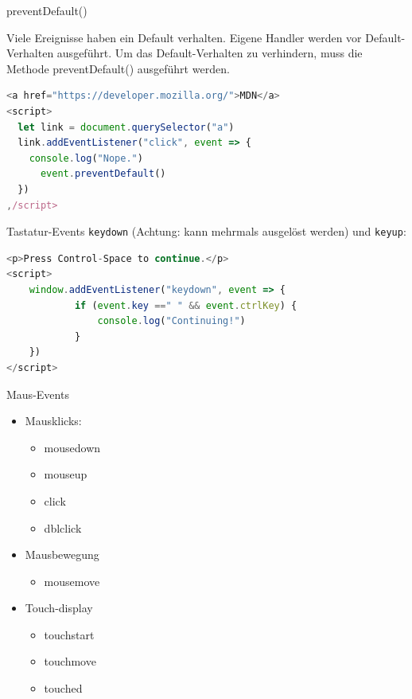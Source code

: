 \begin{examplecode}{preventDefault()}

Viele Ereignisse haben ein Default verhalten. Eigene Handler werden vor Default-Verhalten ausgeführt. Um das Default-Verhalten zu verhindern, muss die Methode preventDefault() ausgeführt werden.
\begin{lstlisting}[language=JavaScript, style=basesmol]
<a href="https://developer.mozilla.org/">MDN</a>
<script>
  let link = document.querySelector("a")
  link.addEventListener("click", event => {
    console.log("Nope.")
      event.preventDefault()
  })
,/script>
\end{lstlisting}
\end{examplecode}

\begin{definition}{Tastatur-Events}
\texttt{keydown} (Achtung: kann mehrmals ausgelöst werden) und \texttt{keyup}:
\begin{lstlisting}[language=JavaScript, style=basesmol]
<p>Press Control-Space to continue.</p>
<script>
    window.addEventListener("keydown", event => {
            if (event.key ==" " && event.ctrlKey) {
                console.log("Continuing!")
            }
    })
</script>
\end{lstlisting}
\end{definition}

\begin{definition}{Maus-Events}
  
  \begin{minipage}{0.45\linewidth}
  \begin{itemize}
  \item Mausklicks:
  \begin{itemize}
    \item mousedown
    \item mouseup
    \item click
    \item dblclick
  \end{itemize}
  \end{itemize}
  \end{minipage}
  \begin{minipage}{0.5\linewidth}
    \begin{itemize}
    \item Mausbewegung
    \begin{itemize}
      \item mousemove
    \end{itemize}
    \item Touch-display
    \begin{itemize}
      \item touchstart
      \item touchmove
      \item touched
    \end{itemize}
    \end{itemize}
    \end{minipage}
\end{definition}



